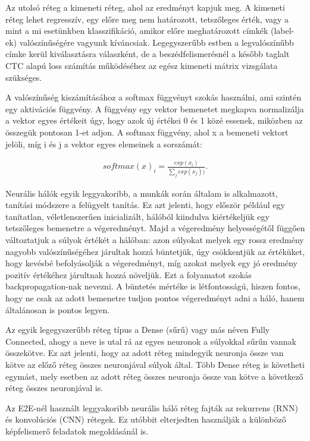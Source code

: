 Az utolsó réteg a kimeneti réteg, ahol az eredményt kapjuk meg. A kimeneti réteg lehet regresszív, egy előre meg nem határozott, tetszőleges érték, vagy a mint a mi esetünkben klasszifikáció, amikor előre meghatározott címkék (label-ek) valószínűségére vagyunk kíváncsiak. Legegyszerűbb estben a legvalószínűbb címke kerül kiválasztásra válaszként, de a beszédfelismerésnél a később taglalt CTC alapú loss számítás működéséhez az egész kimeneti mátrix vizsgálata szükséges.

A valószínűség kiszámításához a softmax \cite{softmax} függvényt szokás használni, ami szintén egy aktivációs függvény. A függvény egy vektor bemenetet megkapva normalizálja a vektor egyes értékeit úgy, hogy azok új értékei 0 és 1 közé essenek, miközben az összegük pontosan 1-et adjon. A softmax függvény, ahol x a bemeneti vektort jelöli, míg i és j a vektor egyes elemeinek a sorszámát:

\begin{align}
softmax(x)_i = \frac{exp(x_i)}{\sum_{j}^{ }exp(x_j))}.
\end{align}

Neurális hálók egyik leggyakoribb, a munkák során általam is alkalmazott, tanítási módszere a felügyelt tanítás. Ez azt jelenti, hogy először például egy tanítatlan, véletlenszerűen inicializált, hálóból kiindulva kiértékeljük egy tetszőleges bemenetre a végeredményt. Majd a végeredmény helyességétől függően változtatjuk a súlyok értékét a hálóban: azon súlyokat melyek egy rossz eredmény nagyobb valószínűségéhez járultak hozzá büntetjük, úgy csökkentjük az értéküket, hogy kevésbé befolyásolják a végeredményt, míg azokat melyek egy jó eredmény pozitív értékéhez járultnak hozzá növeljük. Ezt a folyamatot szokás backpropagation-nak nevezni. A büntetés mértéke is létfontosságú, hiszen fontos, hogy ne csak az adott bemenetre tudjon pontos végeredményt adni a háló, hanem általánosan is pontos legyen. 

Az egyik legegyszerűbb réteg típus a Dense (sűrű) vagy más néven Fully Connected, ahogy a neve is utal rá az egyes neuronok a súlyokkal sűrűn vannak összekötve. Ez azt jelenti, hogy az adott réteg mindegyik neuronja össze van kötve az előző réteg összes neuronjával súlyok által. Több Dense réteg is követheti egymást, mely esetben az adott réteg összes neuronja össze van kötve a következő réteg összes neuronjával is.

Az E2E-nél használt leggyakoribb neurális háló réteg fajták az rekurrens (RNN) és konvolúciós (CNN) rétegek. Ez utóbbit elterjedten használják a különböző képfelismerő feladatok megoldásánál is.

